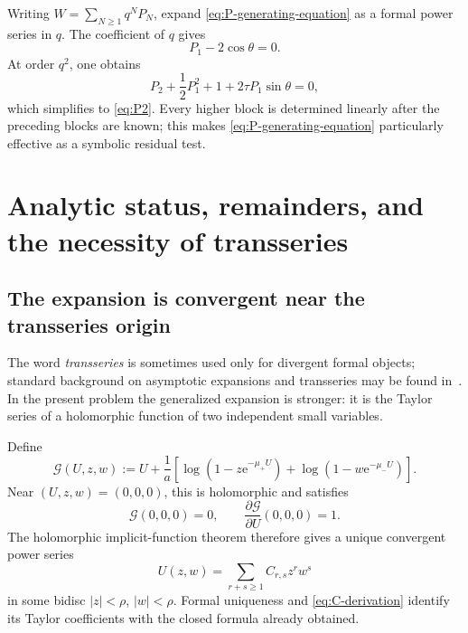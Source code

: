 \documentclass[11pt,oneside]{article}
\numberwithin{equation}{section}
\newcommand{\e}{\mathrm{e}}
\begin{document}
Writing \(W=\sum_{N\ge1}q^NP_N\), expand
\cref{eq:P-generating-equation} as a formal power series in \(q\).  The
coefficient of \(q\) gives
\begin{equation}
  P_1-2\cos\theta=0.
\end{equation}
At order \(q^2\), one obtains
\begin{equation}
  P_2+\frac12P_1^2+1+2\tau P_1\sin\theta=0,
\end{equation}
which simplifies to \cref{eq:P2}.  Every higher block is determined linearly
after the preceding blocks are known; this makes
\cref{eq:P-generating-equation} particularly effective as a symbolic residual
test.

\section{Analytic status, remainders, and the necessity of transseries}
\label{sec:analytic-status}

\subsection{The expansion is convergent near the transseries origin}

The word \emph{transseries} is sometimes used only for divergent formal
objects; standard background on asymptotic expansions and transseries may be found in~\cite{Olver1997,Edgar2010,vanderHoeven2006,ADH2017}.  In the present problem the generalized expansion is stronger: it is
the Taylor series of a holomorphic function of two independent small
variables.

Define
\begin{equation}
 \mathcal{G}(U,z,w):=
 U+\frac1a\left[
 \log\left(1-z\e^{-\mu_+U}\right)
 +\log\left(1-w\e^{-\mu_-U}\right)
 \right].
 \label{eq:G-holomorphic}
\end{equation}
Near \((U,z,w)=(0,0,0)\), this is holomorphic and satisfies
\begin{equation}
  \mathcal{G}(0,0,0)=0,
  \qquad
  \frac{\partial\mathcal{G}}{\partial U}(0,0,0)=1.
\end{equation}
The holomorphic implicit-function theorem therefore gives a unique convergent
power series
\begin{equation}
  U(z,w)=\sum_{r+s\ge1}C_{r,s}z^rw^s
  \label{eq:U-holomorphic-series}
\end{equation}
in some bidisc \(|z|<\rho\), \(|w|<\rho\).  Formal uniqueness and
\cref{eq:C-derivation} identify its Taylor coefficients with the closed formula
already obtained.
\end{document}
